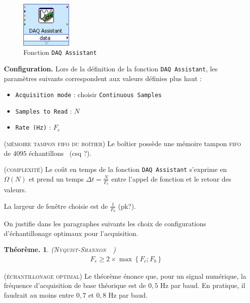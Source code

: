 \documentclass[twocolumn,pre,floats,aps,amsmath,amssymb]{revtex4}
\newtheorem{theorem}{Th\'eor\`eme.}[section]
\newenvironment{remark}[1][Remarque.]{\begin{trivlist}
\item[\hskip \labelsep {\bfseries #1}]}{\end{trivlist}}
\begin{document}
\begin{figure}[h]
  \includegraphics[width=2.5cm]{pictures/DAQ_Assistant.png}
\caption{Fonction \texttt{DAQ Assistant}}
\label{fig:NI_DAQ_Assitant}
\end{figure}

\noindent
\textbf{Configuration.} Lors de la d\'efinition de la fonction \texttt{DAQ Assistant}, les param\`etres suivants correspondent aux valeurs d\'efinies plus haut :
\begin{itemize}
  \item{\texttt{Acquisition mode} : choisir \texttt{Continuous Samples}}~\cite{NI_continuous_samp}
  \item{\texttt{Samples to Read} : $N$}
  \item{\texttt{Rate (Hz)} : $F_e$}
\end{itemize}

\begin{remark}
  (\textsc{m\'emoire tampon fifo du bo\^itier})
  Le bo\^itier poss\`ede une m\'emoire tampon \textsc{fifo} de $4095$ \'echantillons~\cite{NI_6353_datasheet} (csq ?).
\end{remark}

\begin{remark}
  \textsc{(complexit\'e)}
  Le co\^ut en temps de la fonction \texttt{DAQ Assistant} s'exprime en $\Omega(N)$\cite{omega} et prend un temps $\Delta t = \frac{N}{F_e}$ entre l'appel de fonction et le retour des valeurs.
\end{remark}

La largeur de fen\^etre choisie est de $\frac{1}{F_b}$ (pk?).

On justifie dans les paragraphes suivants les choix de configurations d'\'echantillonage optimaux pour l'acquisition.

\begin{theorem} (\textsc{Nyquist-Shannon}~\cite{Nyquist}~\cite{Shannon})
  \begin{eqnarray}
    F_e \geq 2 \times \operatorname{max} \left \{ F_c ; F_b \right \}
  \end{eqnarray}
\end{theorem}

\begin{remark}
  \textsc{(\'echantillonage optimal)}
  Le th\'eor\`eme \'enonce que, pour un signal num\'erique, la fr\'equence d'acquisition de base th\'eorique est de $0,5$ Hz par baud. En pratique, il faudrait au moins entre $0,7$ et $0,8$ Hz par baud\cite{FV}.
\end{remark}
\end{document}
